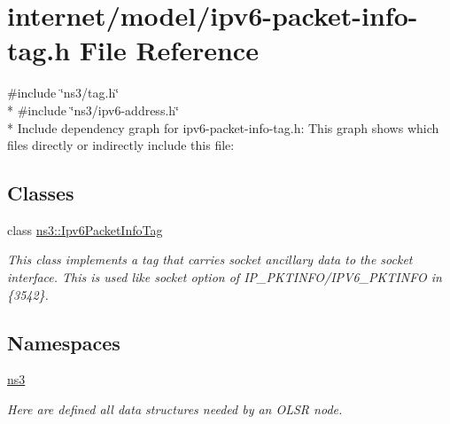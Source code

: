 \hypertarget{ipv6-packet-info-tag_8h}{}\section{internet/model/ipv6-\/packet-\/info-\/tag.h File Reference}
\label{ipv6-packet-info-tag_8h}
{\ttfamily \#include \char`\"{}ns3/tag.\+h\char`\"{}}\\*
{\ttfamily \#include \char`\"{}ns3/ipv6-\/address.\+h\char`\"{}}\\*
Include dependency graph for ipv6-\/packet-\/info-\/tag.h\+:
This graph shows which files directly or indirectly include this file\+:
\subsection*{Classes}
\begin{DoxyCompactItemize}
\item 
class \hyperlink{classns3_1_1Ipv6PacketInfoTag}{ns3\+::\+Ipv6\+Packet\+Info\+Tag}
\begin{DoxyCompactList}\small\item\em This class implements a tag that carries socket ancillary data to the socket interface. This is used like socket option of I\+P\+\_\+\+P\+K\+T\+I\+N\+F\+O/\+I\+P\+V6\+\_\+\+P\+K\+T\+I\+N\+FO in \{3542\}. \end{DoxyCompactList}\end{DoxyCompactItemize}
\subsection*{Namespaces}
\begin{DoxyCompactItemize}
\item 
 \hyperlink{namespacens3}{ns3}
\begin{DoxyCompactList}\small\item\em Here are defined all data structures needed by an O\+L\+SR node. \end{DoxyCompactList}\end{DoxyCompactItemize}
